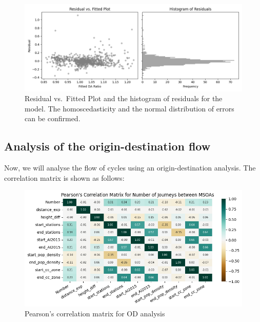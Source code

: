 \documentclass[
  12pt,
  a4paper,
  DIV=11,
  numbers=noendperiod]{scrartcl}
\begin{document}
\begin{figure}

{\centering \includegraphics{img/residual_DA.png}

}

\caption{Residual vs.~Fitted Plot and the histogram of residuals for the
model. The homoscedasticity and the normal distribution of errors can be
confirmed.}

\end{figure}

\hypertarget{analysis-of-the-origin-destination-flow}{%
\subsection{Analysis of the origin-destination
flow}\label{analysis-of-the-origin-destination-flow}}

Now, we will analyse the flow of cycles using an origin-destination
analysis. The correlation matrix is shown as follows:

\begin{figure}

{\centering \includegraphics{img/cor_matrix_MSOA.png}

}

\caption{Pearson's correlation matrix for OD analysis}

\end{figure}
\end{document}
